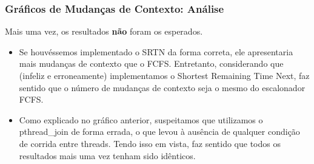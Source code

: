 \documentclass{beamer}
\begin{document}
\begin{frame}
\blindtext

\end{frame}




\begin{frame}
\frametitle{Gráficos de Mudanças de Contexto: Análise}

Mais uma vez, os resultados \textbf{não} foram os esperados.

\begin{itemize}
\item Se houvéssemos implementado o SRTN da forma correta, ele apresentaria mais mudanças de contexto que o FCFS. Entretanto, considerando que (infeliz e erroneamente) implementamos o Shortest Remaining Time Next, faz sentido que o número de mudanças de contexto seja o mesmo do escalonador FCFS.

\item Como explicado no gráfico anterior, suspeitamos que utilizamos o pthread\_join de forma errada, o que levou à ausência de qualquer condição de corrida entre threads. Tendo isso em vista, faz sentido que todos os resultados mais uma vez tenham sido idênticos.

\end{itemize}

\end{frame}
\end{document}
